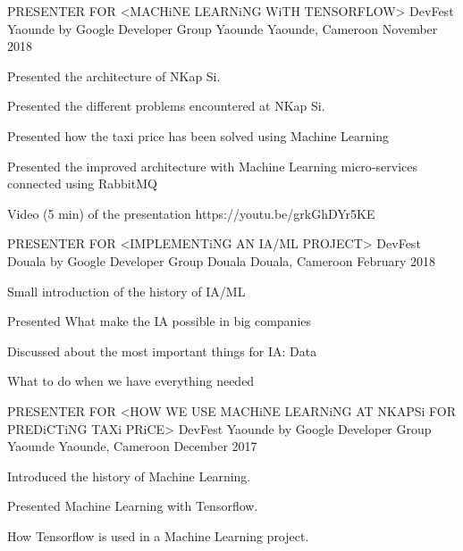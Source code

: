 

\begin{cventries}

  \cventry
    {PRESENTER FOR <MACHiNE LEARNiNG WiTH TENSORFLOW>} %
    {DevFest Yaounde by Google Developer Group Yaounde} %
    {Yaounde, Cameroon} %
    {November 2018} %
    {
      \begin{cvitems} %
        \item {Presented the architecture of NKap Si.}
        \item {Presented the different problems encountered at NKap Si.}
        \item {Presented how the taxi price has been solved using Machine Learning}
        \item {Presented the improved architecture with Machine Learning micro‑services connected using RabbitMQ}
        \item {Video (5 min) of the presentation https://youtu.be/grkGhDYr5KE}
      \end{cvitems}
    }

  \cventry
    {PRESENTER FOR <IMPLEMENTiNG AN IA/ML PROJECT>} %
    {DevFest Douala by Google Developer Group Douala} %
    {Douala, Cameroon} %
    {February 2018} %
    {
      \begin{cvitems} %
        \item {Small introduction of the history of IA/ML}
        \item {Presented What make the IA possible in big companies}
        \item {Discussed about the most important things for IA: Data}
        \item {What to do when we have everything needed}
      \end{cvitems}
    }

  \cventry
    {PRESENTER FOR <HOW WE USE MACHiNE LEARNiNG AT NKAPSi FOR PREDiCTiNG TAXi PRiCE>} %
    {DevFest Yaounde by Google Developer Group Yaounde} %
    {Yaounde, Cameroon} %
    {December 2017} %
    {
      \begin{cvitems} %
        \item {Introduced the history of Machine Learning.}
        \item {Presented Machine Learning with Tensorflow.}
        \item {How Tensorflow is used in a Machine Learning project.}
      \end{cvitems}
    }

\end{cventries}
